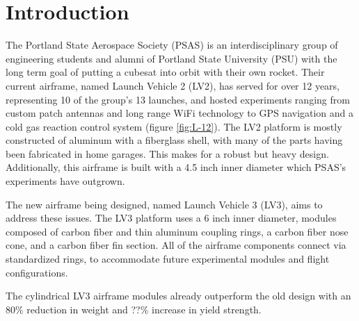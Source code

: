 \documentclass{aiaa-tc}%
\newcommand{\weightReduction}{80\%}
\newcommand{\strengthIncrease}{??\%}
\begin{document}
\section{Introduction}
The Portland State Aerospace Society (PSAS) is an interdisciplinary group of engineering students and alumni of Portland State University (PSU) with the long term goal of putting a cubesat into orbit with their own rocket. 
Their current airframe, named Launch Vehicle 2 (LV2), has served for over 12 years, representing 10 of the group's 13 launches, and hosted experiments ranging from custom patch antennas and long range WiFi technology to GPS navigation and a cold gas reaction control system (figure \ref{fig:L-12}). The LV2 platform is mostly constructed of aluminum with a fiberglass shell, with many of the parts having been fabricated in home garages. This makes for a robust but heavy design. Additionally, this airframe is built with a 4.5 inch inner diameter which PSAS's experiments have outgrown. 

The new airframe being designed, named Launch Vehicle 3 (LV3), aims to address these issues. The LV3 platform uses a 6 inch inner diameter, modules composed of carbon fiber and thin aluminum coupling rings, a carbon fiber nose cone, and a carbon fiber fin section. All of the airframe components connect via standardized rings, to accommodate future experimental modules and flight configurations.

The cylindrical LV3 airframe modules already outperform the old design with an \weightReduction{} reduction in weight and \strengthIncrease{} increase in yield strength. 
\end{document}

